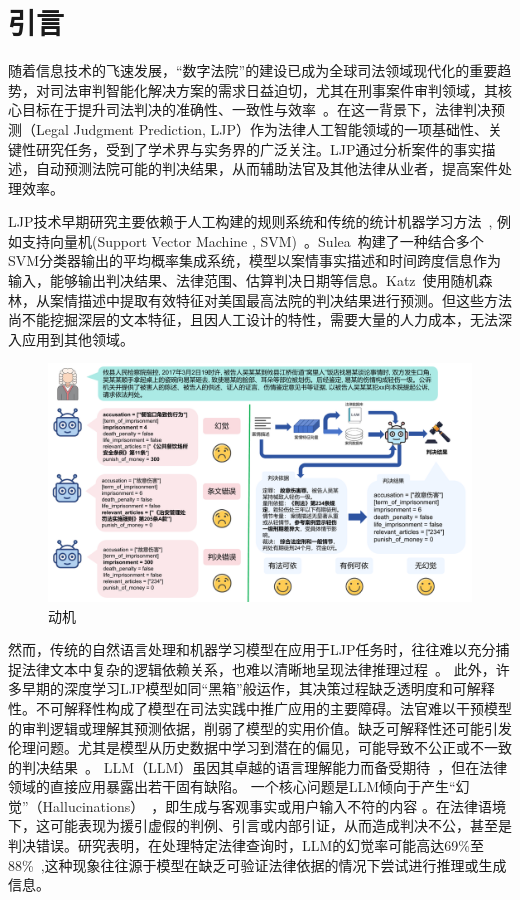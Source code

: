 \section{\heiti 引言}

随着信息技术的飞速发展，“数字法院”的建设已成为全球司法领域现代化的重要趋势，对司法审判智能化解决方案的需求日益迫切，尤其在刑事案件审判领域，其核心目标在于提升司法判决的准确性、一致性与效率~\cite{aletras2016predicting}。在这一背景下，法律判决预测（Legal Judgment Prediction, LJP）作为法律人工智能领域的一项基础性、关键性研究任务，受到了学术界与实务界的广泛关注。LJP通过分析案件的事实描述，自动预测法院可能的判决结果，从而辅助法官及其他法律从业者，提高案件处理效率。

LJP技术早期研究主要依赖于人工构建的规则系统和传统的统计机器学习方法~\cite{katz2017general,keown1980mathematical}, 例如支持向量机(Support Vector  Machine , SVM)~\cite{boella2011using,kim2015legal}。Sulea~\cite{sulea2017exploring}构建了一种结合多个SVM分类器输出的平均概率集成系统，模型以案情事实描述和时间跨度信息作为输入，能够输出判决结果、法律范围、估算判决日期等信息。Katz~\cite{katz2017general}使用随机森林，从案情描述中提取有效特征对美国最高法院的判决结果进行预测。但这些方法尚不能挖掘深层的文本特征，且因人工设计的特性，需要大量的人力成本，无法深入应用到其他领域。
\begin{figure}[htbp]
	\centering
	\includegraphics[width=1\textwidth]{fig/motivation.pdf}
	\caption{动机}
	\label{fig:motivation}
\end{figure}
然而，传统的自然语言处理和机器学习模型在应用于LJP任务时，往往难以充分捕捉法律文本中复杂的逻辑依赖关系，也难以清晰地呈现法律推理过程~\cite{lin2012exploiting,liu2004case}。
此外，许多早期的深度学习LJP模型如同“黑箱”般运作，其决策过程缺乏透明度和可解释性。不可解释性构成了模型在司法实践中推广应用的主要障碍\cite{ling2017program,ma2021law,nye2021show}。法官难以干预模型的审判逻辑或理解其预测依据，削弱了模型的实用价值。缺乏可解释性还可能引发伦理问题。尤其是模型从历史数据中学习到潜在的偏见，可能导致不公正或不一致的判决结果~\cite{luo2017learning,lv2022improving}。
LLM（LLM）虽因其卓越的语言理解能力而备受期待~\cite{jiang2023legal}，但在法律领域的直接应用暴露出若干固有缺陷。
一个核心问题是LLM倾向于产生“幻觉”（Hallucinations）~\cite{lewis2020retrieval,zheng2021when}，即生成与客观事实或用户输入不符的内容 。在法律语境下，这可能表现为援引虚假的判例、引言或内部引证，从而造成判决不公，甚至是判决错误。研究表明，在处理特定法律查询时，LLM的幻觉率可能高达69\%至88\%~\cite{Dahl_2024},这种现象往往源于模型在缺乏可验证法律依据的情况下尝试进行推理或生成信息\cite{zhong2020iteratively,zhong2020jec-qa}。


